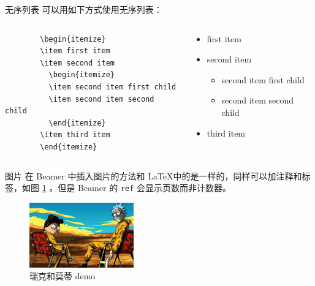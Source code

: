 \documentclass{ctexbeamer}
\begin{document}
\begin{frame}[fragile]{无序列表}
  可以用如下方式使用无序列表：
  
  \begin{columns}
    \begin{column}{0.6\textwidth}
      \begin{verbatim}
        \begin{itemize}
        \item first item
        \item second item
          \begin{itemize}
          \item second item first child
          \item second item second child
          \end{itemize}
        \item third item
        \end{itemize}
      \end{verbatim}
    \end{column}
    
    \begin{column}{0.4\textwidth}
      \begin{itemize}
      \item first item
      \item second item
        \begin{itemize}
        \item second item first child
        \item second item second child
        \end{itemize}
      \item third item
      \end{itemize}
    \end{column}
  \end{columns}
\end{frame}

\begin{frame}[fragile]{图片}
  在 Beamer 中插入图片的方法和 \LaTeX 中的是一样的，同样可以加注释和标签，如图 \ref{demo} 。但是 Beamer 的 \texttt{ref} 会显示页数而非计数器。
  
  \begin{figure}[h!]
    \label{demo}
    \includegraphics[width=0.4\textwidth]{images/demo}
    \centering
    \caption{瑞克和莫蒂 demo}
  \end{figure}
\end{frame}
\end{document}
